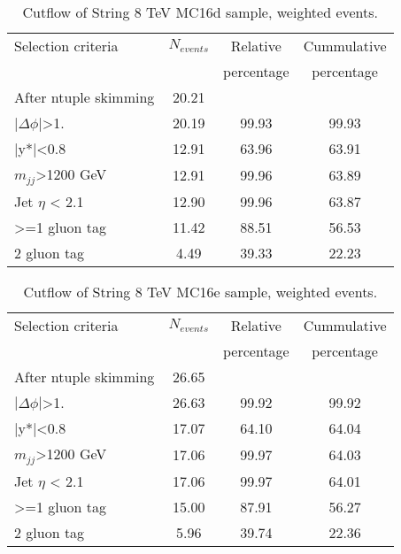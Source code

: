 \begin{table}[ht]
\begin{center}
\begin{tabular}{|l|c|c|c|}
\hline
Selection criteria & $N_{events}$ & Relative & Cummulative \\
 & & percentage & percentage \\
\hline
After ntuple skimming & 20.21 &  &  \\
$|\Delta\phi|$>1. & 20.19 & 99.93 & 99.93 \\
|y*|<0.8 & 12.91 & 63.96 & 63.91 \\
$m_{jj}$>1200 GeV & 12.91 & 99.96 & 63.89 \\
Jet $\eta$ < 2.1 & 12.90 & 99.96 & 63.87 \\
>=1 gluon tag & 11.42 & 88.51 & 56.53 \\
2 gluon tag & 4.49 & 39.33 & 22.23 \\
\hline
\end{tabular}
\end{center}
\caption{Cutflow of String 8 TeV MC16d sample, weighted events.}
\end{table}

\begin{table}[ht]
\begin{center}
\begin{tabular}{|l|c|c|c|}
\hline
Selection criteria & $N_{events}$ & Relative & Cummulative \\
 & & percentage & percentage \\
\hline
After ntuple skimming & 26.65 &  &  \\
$|\Delta\phi|$>1. & 26.63 & 99.92 & 99.92 \\
|y*|<0.8 & 17.07 & 64.10 & 64.04 \\
$m_{jj}$>1200 GeV & 17.06 & 99.97 & 64.03 \\
Jet $\eta$ < 2.1 & 17.06 & 99.97 & 64.01 \\
>=1 gluon tag & 15.00 & 87.91 & 56.27 \\
2 gluon tag & 5.96 & 39.74 & 22.36 \\
\hline
\end{tabular}
\end{center}
\caption{Cutflow of String 8 TeV MC16e sample, weighted events.}
\end{table}

